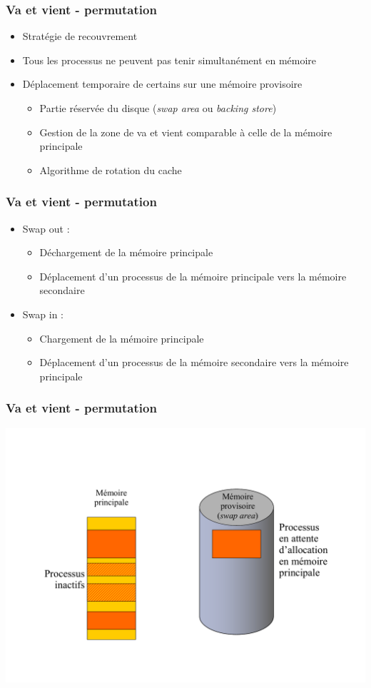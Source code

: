 \begin{frame}
\frametitle{Va et vient - permutation}
\begin{itemize}
\item Stratégie de recouvrement
\item Tous les processus ne peuvent pas tenir simultanément en mémoire
\item Déplacement temporaire de certains sur une mémoire provisoire
\begin{itemize}
\item Partie réservée du disque (\textit{swap area} ou \textit{backing store})
\item Gestion de la zone de va et vient comparable à celle de la mémoire principale
\item Algorithme de rotation du cache
\end{itemize}
\end{itemize}
\end{frame}


\begin{frame}
\frametitle{Va et vient - permutation}
\begin{itemize}
\item Swap out :
\begin{itemize}
\item Déchargement de la mémoire principale
\item Déplacement d'un processus de la mémoire principale vers la mémoire secondaire
\end{itemize}
\item Swap in :
\begin{itemize}
\item Chargement de la mémoire principale
\item Déplacement d'un processus de la mémoire secondaire vers la mémoire principale
\end{itemize}
\end{itemize}
\end{frame}


\begin{frame}
\frametitle{Va et vient - permutation}
\includegraphics[width=\textwidth]{../illustration/permut_swap_exemple.pdf}
\end{frame}


